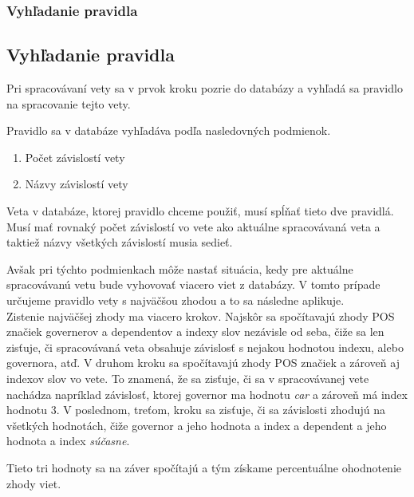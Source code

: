 %
%
{
	\subsubsection{Vyhľadanie pravidla}
}
{
	\subsection{Vyhľadanie pravidla}
}
\label{subsubsec:notenizer_vyhladanie_pravidla}
Pri spracovávaní vety sa v prvok kroku pozrie do databázy a vyhľadá sa pravidlo na spracovanie tejto vety.

Pravidlo sa v databáze vyhľadáva podľa nasledovných podmienok.
\begin{enumerate}
	\item Počet závislostí vety
	\item Názvy závislostí vety
\end{enumerate}
Veta v databáze, ktorej pravidlo chceme použiť, musí spĺňať tieto dve pravidlá. Musí mať rovnaký počet závislostí vo vete ako aktuálne spracovávaná veta a taktiež názvy všetkých závislostí musia sedieť.

Avšak pri týchto podmienkach môže nastať situácia, kedy pre aktuálne spracovávanú vetu bude vyhovovať viacero viet z databázy. V tomto prípade určujeme pravidlo vety s najväčšou zhodou a to sa následne aplikuje.
\\

Zistenie najväčšej zhody ma viacero krokov. Najskôr sa spočítavajú zhody POS značiek governerov a dependentov a indexy slov nezávisle od seba, čiže sa len zisťuje, či spracovávaná veta obsahuje závislosť s nejakou hodnotou indexu, alebo governora, atď.
V druhom kroku sa spočítavajú zhody POS značiek a zároveň aj indexov slov vo vete. To znamená, že sa zisťuje, či sa v spracovávanej vete nachádza napríklad závislosť, ktorej governor ma hodnotu \textit{car} a zároveň má index hodnotu 3.
V poslednom, treťom, kroku sa zisťuje, či sa závislosti zhodujú na všetkých hodnotách, čiže governor a jeho hodnota a index a dependent a jeho hodnota a index \textit{súčasne}.

Tieto tri hodnoty sa na záver spočítajú a tým získame percentuálne ohodnotenie zhody viet.

